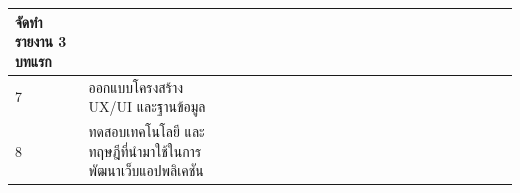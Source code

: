 \documentclass[12pt,oneside,openright,a4paper]{cpe-thai-project}
\begin{document}
\begin{table}[!ht]
{\begin{tabular}{|llllllllllllllllllllll|}
      \multicolumn{1}{l|}{จัดทำรายงาน   3 บทแรก} &
      \multicolumn{1}{l|}{} &
      \multicolumn{1}{l|}{} &
      \multicolumn{1}{l|}{} &
      \multicolumn{1}{l|}{} &
      \multicolumn{1}{l|}{\cellcolor[HTML]{FFCE93}} &
      \multicolumn{1}{l|}{\cellcolor[HTML]{FFCE93}} &
      \multicolumn{1}{l|}{\cellcolor[HTML]{FFCE93}} &
      \multicolumn{1}{l|}{\cellcolor[HTML]{FFCE93}} &
      \multicolumn{1}{l|}{\cellcolor[HTML]{FFCE93}} &
      \multicolumn{1}{l|}{\cellcolor[HTML]{FFCE93}} &
      \multicolumn{1}{l|}{\cellcolor[HTML]{FFCE93}} &
      \multicolumn{1}{l|}{\cellcolor[HTML]{FFCE93}} &
      \multicolumn{1}{l|}{\cellcolor[HTML]{FFCE93}} &
      \multicolumn{1}{l|}{\cellcolor[HTML]{FFCE93}} &
      \multicolumn{1}{l|}{\cellcolor[HTML]{FFCE93}} &
      \multicolumn{1}{l|}{} &
      \multicolumn{1}{l|}{} &
      \multicolumn{1}{l|}{} &
      \multicolumn{1}{l|}{} &
       \\ \hline
    \multicolumn{1}{|l|}{7} &
      \multicolumn{1}{l|}{ออกแบบโครงสร้าง UX/UI และฐานข้อมูล} &
      \multicolumn{1}{l|}{} &
      \multicolumn{1}{l|}{} &
      \multicolumn{1}{l|}{} &
      \multicolumn{1}{l|}{} &
      \multicolumn{1}{l|}{} &
      \multicolumn{1}{l|}{\cellcolor[HTML]{FFCE93}} &
      \multicolumn{1}{l|}{\cellcolor[HTML]{FFCE93}} &
      \multicolumn{1}{l|}{\cellcolor[HTML]{FFCE93}} &
      \multicolumn{1}{l|}{\cellcolor[HTML]{FFCE93}} &
      \multicolumn{1}{l|}{\cellcolor[HTML]{FFCE93}} &
      \multicolumn{1}{l|}{\cellcolor[HTML]{FFCE93}} &
      \multicolumn{1}{l|}{\cellcolor[HTML]{FFCE93}} &
      \multicolumn{1}{l|}{\cellcolor[HTML]{FFCE93}} &
      \multicolumn{1}{l|}{\cellcolor[HTML]{FFCE93}} &
      \multicolumn{1}{l|}{\cellcolor[HTML]{FFCE93}} &
      \multicolumn{1}{l|}{\cellcolor[HTML]{FFCE93}} &
      \multicolumn{1}{l|}{\cellcolor[HTML]{FFCE93}} &
      \multicolumn{1}{l|}{\cellcolor[HTML]{FFCE93}} &
      \multicolumn{1}{l|}{\cellcolor[HTML]{FFCE93}} &
      \cellcolor[HTML]{FFCE93} \\ \hline
    \multicolumn{1}{|l|}{8} &
      \multicolumn{1}{l|}{ทดสอบเทคโนโลยี และทฤษฎีที่นำมาใช้ในการพัฒนาเว็บแอปพลิเคชัน} &
      \multicolumn{1}{l|}{} &
      \multicolumn{1}{l|}{} &
      \multicolumn{1}{l|}{} &
      \multicolumn{1}{l|}{} &
      \multicolumn{1}{l|}{} &
      \multicolumn{1}{l|}{\cellcolor[HTML]{FFCE93}} &
      \multicolumn{1}{l|}{\cellcolor[HTML]{FFCE93}} &
      \multicolumn{1}{l|}{\cellcolor[HTML]{FFCE93}} &
      \multicolumn{1}{l|}{\cellcolor[HTML]{FFCE93}} &
      \multicolumn{1}{l|}{\cellcolor[HTML]{FFCE93}} &
      \multicolumn{1}{l|}{\cellcolor[HTML]{FFCE93}} &

\end{tabular}}
\end{table}
\end{document}
